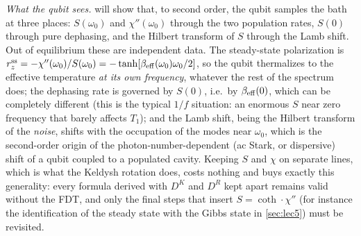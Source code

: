 \emph{What the qubit sees.}
 will show that, to second order, the qubit samples the bath at three places: $S(\omega_0)$ and $\chi''(\omega_0)$ through the two population rates, $S(0)$ through pure dephasing, and the Hilbert transform of $S$ through the Lamb shift.
Out of equilibrium these are independent data.
The steady-state polarization is $r_z^{\rm ss}=-\chi''(\omega_0)/S(\omega_0)=-\tanh[\beta_{\rm eff}(\omega_0)\omega_0/2]$, so the qubit thermalizes to the effective temperature \emph{at its own frequency}, whatever the rest of the spectrum does; the dephasing rate is governed by $S(0)$, i.e.\ by $\beta_{\rm eff}(0)$, which can be completely different (this is the typical $1/f$ situation: an enormous $S$ near zero frequency that barely affects $T_1$); and the Lamb shift, being the Hilbert transform of the \emph{noise}, shifts with the occupation of the modes near $\omega_0$, which is the second-order origin of the photon-number-dependent (ac Stark, or dispersive) shift of a qubit coupled to a populated cavity.
Keeping $S$ and $\chi$ on separate lines, which is what the Keldysh rotation does, costs nothing and buys exactly this generality: every formula derived with $D^K$ and $D^R$ kept apart remains valid without the FDT, and only the final steps that insert $S=\coth\cdot\chi''$ (for instance the identification of the steady state with the Gibbs state in \cref{sec:lec5}) must be revisited.

